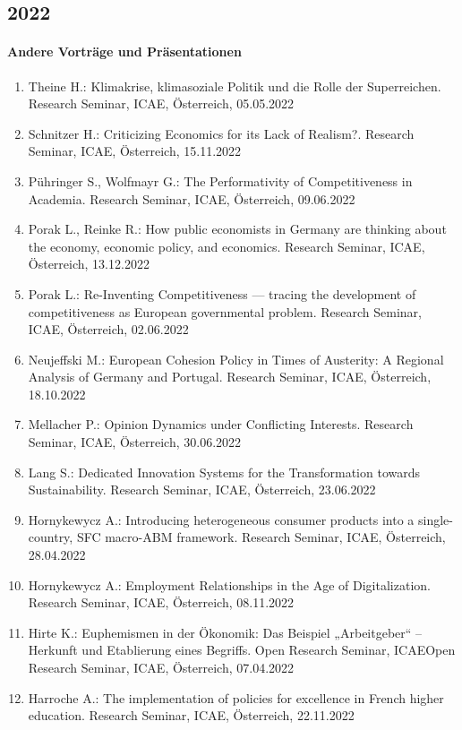 \subsection*{2022}

    \paragraph{Andere Vorträge und Präsentationen}
\begin{enumerate}
	\item Theine H.: Klimakrise, klimasoziale Politik und die Rolle der Superreichen. Research Seminar, ICAE, Österreich, 05.05.2022
	\item Schnitzer H.: Criticizing Economics for its Lack of Realism?. Research Seminar, ICAE, Österreich, 15.11.2022
	\item Pühringer S., Wolfmayr G.: The Performativity of Competitiveness in Academia. Research Seminar, ICAE, Österreich, 09.06.2022
	\item Porak L., Reinke R.: How public economists in Germany are thinking about the economy, economic policy, and economics. Research Seminar, ICAE, Österreich, 13.12.2022
	\item Porak L.: Re-Inventing Competitiveness — tracing the development of competitiveness as European governmental problem. Research Seminar, ICAE, Österreich, 02.06.2022
	\item Neujeffski M.: European Cohesion Policy in Times of Austerity: A Regional Analysis of Germany and Portugal. Research Seminar, ICAE, Österreich, 18.10.2022
	\item Mellacher P.: Opinion Dynamics under Conflicting Interests. Research Seminar, ICAE, Österreich, 30.06.2022
	\item Lang S.: Dedicated Innovation Systems for the Transformation towards Sustainability. Research Seminar, ICAE, Österreich, 23.06.2022
	\item Hornykewycz A.: Introducing heterogeneous consumer products into a single-country, SFC macro-ABM framework. Research Seminar, ICAE, Österreich, 28.04.2022
	\item Hornykewycz A.: Employment Relationships in the Age of Digitalization. Research Seminar, ICAE, Österreich, 08.11.2022
	\item Hirte K.: Euphemismen in der Ökonomik: Das Beispiel „Arbeitgeber“ – Herkunft und Etablierung eines Begriffs. Open Research Seminar, ICAEOpen Research Seminar, ICAE, Österreich, 07.04.2022
	\item Harroche A.: The implementation of policies for excellence in French higher education. Research Seminar, ICAE, Österreich, 22.11.2022

\end{enumerate}
